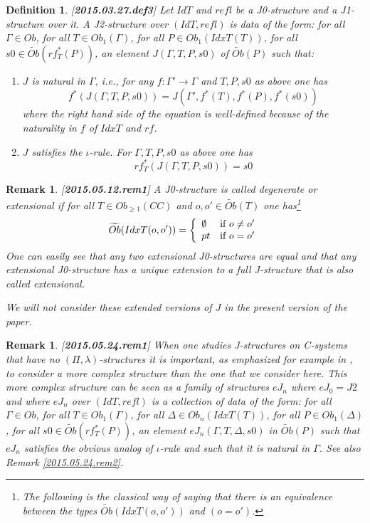 \documentclass[12pt]{article}
\newtheorem{definition}[proposition]{Definition}
\newtheorem{remark}[proposition]{Remark}
\newcommand{\llabel}[1]{\label{#1}[{\bf #1}]}
\newcommand{\sr}{\rightarrow}
\newcommand{\wt}{\widetilde}
\begin{document}
%
\begin{definition}
\llabel{2015.03.27.def3}
Let $IdT$ and $refl$ be a J0-structure and a J1-structure over it. A J2-structure over $(IdT,refl)$ is data of the form: for all $\Gamma\in Ob$, for all $T\in Ob_1(\Gamma)$, for all $P\in Ob_1(IdxT(T))$, for all $s0\in \wt{Ob}(rf_T^*(P))$, an element $J(\Gamma,T,P,s0)$ of $\wt{Ob}(P)$ such that:
%
\begin{enumerate}
\item $J$ is natural in $\Gamma$, i.e., for any $f:\Gamma'\sr \Gamma$ and $T,P,s0$ as above one has
%
$$f^*(J(\Gamma,T,P,s0))=J(\Gamma',f^*(T),f^*(P),f^*(s0))$$
%
where the right hand side of the equation is well-defined because of the naturality in $f$ of $IdxT$ and $rf$. 
\item $J$ satisfies the $\iota$-rule. For $\Gamma, T, P, s0$ as above one has
%
$$rf_T^*(J(\Gamma,T,P,s0))=s0$$
%
\end{enumerate}
\end{definition}
%
\begin{remark}
\llabel{2015.05.12.rem1}\rm
A J0-structure is called degenerate or extensional if for all $T\in Ob_{\ge 1}(CC)$ and $o,o'\in \wt{Ob}(T)$ one has\footnote{The following is the classical way of saying that there is an equivalence between the types $\wt{Ob}(IdxT(o,o'))$ and $(o=o')$.}
%
$$\wt{Ob}(IdxT(o,o'))=\left\{
\begin{array}{ll}
\emptyset&\mbox{\rm if $o\ne o'$}\\
pt&\mbox{\rm if $o=o'$}
\end{array}
\right.
$$
%
One can easily see that any two extensional J0-structures are equal and that any extensional J0-structure has a unique extension to a full J-structure that is also called extensional. 

We will not consider these extended versions of $J$ in the present version of the paper. 
\end{remark}


%
\begin{remark}\rm
\llabel{2015.05.24.rem1}
When one studies J-structures on C-systems that have no $(\Pi,\lambda)$-structures it is important, as emphasized for example in \cite{vandenBergGarner2011}, to consider a more complex structure than the one that we consider here. This more complex structure can be seen as a family of structures $eJ_n$ where $eJ_0=J2$ and where $eJ_n$ over $(IdT,refl)$ is a collection of data of the form: for all $\Gamma\in Ob$, for all $T\in Ob_1(\Gamma)$, for all $\Delta\in Ob_{n}(IdxT(T))$, for all $P\in Ob_1(\Delta)$, for all $s0\in \wt{Ob}(rf_T^*(P))$, an element $eJ_n(\Gamma,T,\Delta,s0)$ in $\wt{Ob}(P)$ such that $eJ_n$ satisfies the obvious analog of $\iota$-rule and such that it is natural in $\Gamma$. See also Remark \ref{2015.05.24.rem2}. 
\end{remark}
\end{document}
